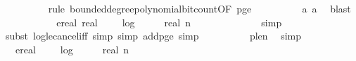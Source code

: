 \begin{isabellebody}
\ \ \ \ \ \ \ \ \isamarkupfalse%
\ {\isacharparenleft}{\kern0pt}rule\ bounded{\isacharunderscore}{\kern0pt}degree{\isacharunderscore}{\kern0pt}polynomial{\isacharunderscore}{\kern0pt}bit{\isacharunderscore}{\kern0pt}count{\isacharbrackleft}{\kern0pt}OF\ p{\isacharunderscore}{\kern0pt}ge{\isacharunderscore}{\kern0pt}{}{\isacharbrackright}{\kern0pt}{\isacharparenright}{\kern0pt}\isanewline
\ \ \ \ \ \ \ \ \isamarkupfalse%
\ a{\isacharunderscore}{\kern0pt}{}\ a{\isacharunderscore}{\kern0pt}{}\ \isamarkupfalse%
\ blast\isanewline
\ \ \ \ \ \ \isamarkupfalse%
\ \isamarkupfalse%
\ {\isachardoublequoteopen}{\isachardot}{\kern0pt}{\isachardot}{\kern0pt}{\isachardot}{\kern0pt}\ {\isasymle}\ ereal\ {\isacharparenleft}{\kern0pt}real\ {}\ {\isacharasterisk}{\kern0pt}\ {\isacharparenleft}{\kern0pt}{}\ {\isacharasterisk}{\kern0pt}\ log\ {}\ {\isacharparenleft}{\kern0pt}{}\ {\isacharplus}{\kern0pt}\ {}\ {\isacharasterisk}{\kern0pt}\ real\ n{\isacharparenright}{\kern0pt}\ {\isacharplus}{\kern0pt}\ {}{\isacharparenright}{\kern0pt}\ {\isacharplus}{\kern0pt}\ {}{\isacharparenright}{\kern0pt}{\isachardoublequoteclose}\isanewline
\ \ \ \ \ \ \ \ \isamarkupfalse%
\ simp\isanewline
\ \ \ \ \ \ \ \ \isamarkupfalse%
\ {\isacharparenleft}{\kern0pt}subst\ log{\isacharunderscore}{\kern0pt}le{\isacharunderscore}{\kern0pt}cancel{\isacharunderscore}{\kern0pt}iff{\isacharcomma}{\kern0pt}\ simp{\isacharcomma}{\kern0pt}\ simp\ add{\isacharcolon}{\kern0pt}p{\isacharunderscore}{\kern0pt}ge{\isacharunderscore}{\kern0pt}{}{\isacharcomma}{\kern0pt}\ simp{\isacharparenright}{\kern0pt}\isanewline
\ \ \ \ \ \ \ \ \isamarkupfalse%
\ p{\isacharunderscore}{\kern0pt}le{\isacharunderscore}{\kern0pt}n\ \isamarkupfalse%
\ simp\isanewline
\ \ \ \ \ \ \isamarkupfalse%
\ \isamarkupfalse%
\ {\isachardoublequoteopen}{\isachardot}{\kern0pt}{\isachardot}{\kern0pt}{\isachardot}{\kern0pt}\ {\isasymle}\ ereal\ {\isacharparenleft}{\kern0pt}{}\ {\isacharplus}{\kern0pt}\ {}\ {\isacharasterisk}{\kern0pt}\ log\ {}\ {\isacharparenleft}{\kern0pt}{}\ {\isacharplus}{\kern0pt}\ {}\ {\isacharasterisk}{\kern0pt}\ real\ n{\isacharparenright}{\kern0pt}{\isacharparenright}{\kern0pt}{\isachardoublequoteclose}\isanewline
\ \ \ \ \ \ \ \ \isamarkupfalse%

\end{isabellebody}
